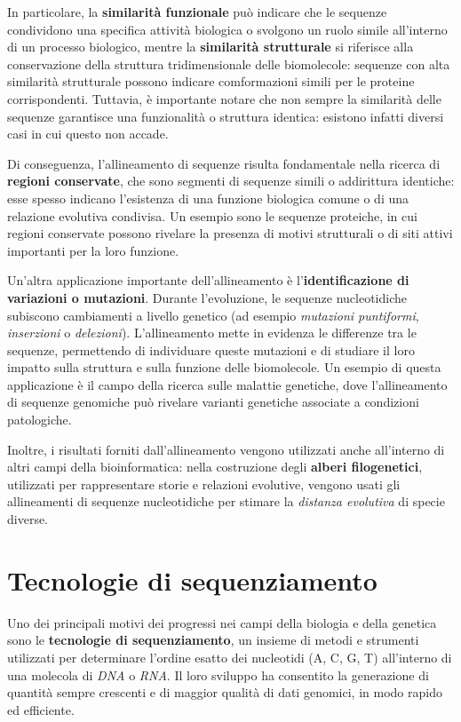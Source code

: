     In particolare, la \textbf{similarità funzionale} può indicare che le sequenze condividono una specifica attività biologica o svolgono un ruolo simile all'interno di un processo biologico, mentre la \textbf{similarità strutturale} si riferisce alla conservazione della struttura tridimensionale delle biomolecole: sequenze con alta similarità strutturale possono indicare comformazioni simili per le proteine corrispondenti. Tuttavia, è importante notare che non sempre la similarità delle sequenze garantisce una funzionalità o struttura identica: esistono infatti diversi casi in cui questo non accade. 
    
    Di conseguenza, l'allineamento di sequenze risulta fondamentale nella ricerca di \textbf{regioni conservate}, che sono segmenti di sequenze simili o addirittura identiche: esse spesso indicano l'esistenza di una funzione biologica comune o di una relazione evolutiva condivisa. Un esempio sono le sequenze proteiche, in cui regioni conservate possono rivelare la presenza di motivi strutturali o di siti attivi importanti per la loro funzione.
    
    Un'altra applicazione importante dell'allineamento è l'\textbf{identificazione di variazioni o mutazioni}. Durante l'evoluzione, le sequenze nucleotidiche subiscono cambiamenti a livello genetico (ad esempio \emph{mutazioni puntiformi}, \emph{inserzioni} o \emph{delezioni}). L'allineamento mette in evidenza le differenze tra le sequenze, permettendo di individuare queste mutazioni e di studiare il loro impatto sulla struttura e sulla funzione delle biomolecole. Un esempio di questa applicazione è il campo della ricerca sulle malattie genetiche, dove l'allineamento di sequenze genomiche può rivelare varianti genetiche associate a condizioni patologiche.
    
    Inoltre, i risultati forniti dall'allineamento vengono utilizzati anche all'interno di altri campi della bioinformatica: nella costruzione degli \textbf{alberi filogenetici}, utilizzati per rappresentare storie e relazioni evolutive, vengono usati gli allineamenti di sequenze nucleotidiche per stimare la \emph{distanza evolutiva} di specie diverse.

\section{Tecnologie di sequenziamento}
    Uno dei principali motivi dei progressi nei campi della biologia e della genetica sono le \textbf{tecnologie di sequenziamento}, un insieme di metodi e strumenti utilizzati per determinare l'ordine esatto dei nucleotidi (A, C, G, T) all'interno di una molecola di \emph{DNA} o \emph{RNA}. Il loro sviluppo ha consentito la generazione di quantità sempre crescenti e di maggior qualità di dati genomici, in modo rapido ed efficiente.

